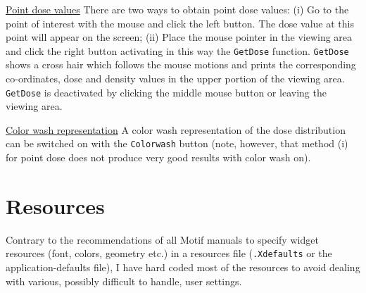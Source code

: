 \documentclass[12pt]{article}
\begin{document}
\noindent
\underline{\sffamily Point dose values}
There are two ways to obtain point dose values: (i) Go to the
point of interest with the mouse and click the left button.
The dose value at this point will appear on the screen;
(ii) Place the mouse pointer in the viewing area and click the
right button activating in this way the {\tt GetDose} function.
{\tt GetDose} shows a cross hair which follows the mouse motions
and prints the corresponding co-ordinates, dose and density
values in the upper portion of the viewing area. {\tt GetDose} is
deactivated by clicking the middle mouse button or leaving
the viewing area.

\noindent
\underline{\sffamily Color wash representation}
A color wash
representation of the dose distribution
can be switched on with the {\tt Colorwash} button
(note, however, that method (i) for point dose does not
produce very good results with color wash on).

\section{\sffamily Resources}

Contrary to the recommendations of all Motif manuals to
specify widget resources (font, colors, geometry etc.) in a
resources file ({\tt .Xdefaults} or the application-defaults file),
I have hard coded most of the resources to avoid dealing
with various, possibly difficult to handle, user settings.
\end{document}
